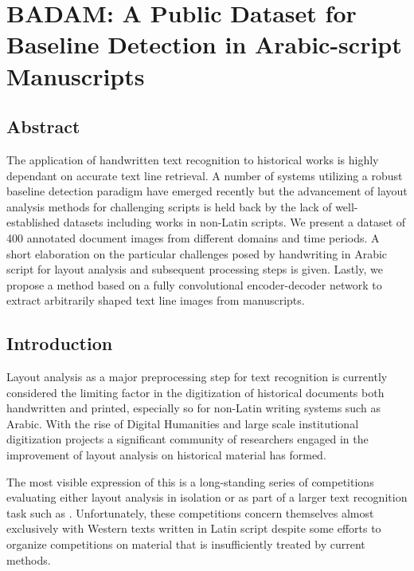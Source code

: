 \chapter{BADAM: A Public Dataset for Baseline Detection in Arabic-script Manuscripts}

\section{Abstract}
	The application of handwritten text recognition to historical works is
	highly dependant on accurate text line retrieval. A number of systems
	utilizing a robust baseline detection paradigm have emerged recently
	but the advancement of layout analysis methods for challenging scripts
	is held back by the lack of well-established datasets including works
	in non-Latin scripts. We present a dataset of 400 annotated document
	images from different domains and time periods. A short elaboration on
	the particular challenges posed by handwriting in Arabic script for
	layout analysis and subsequent processing steps is given.  Lastly, we
	propose a method based on a fully convolutional encoder-decoder network
	to extract arbitrarily shaped text line images from manuscripts.

\section{Introduction}

Layout analysis as a major preprocessing step for text recognition is currently
considered the limiting factor in the digitization of historical documents both
handwritten and printed, especially so for non-Latin writing systems such as
Arabic. With the rise of Digital Humanities and large scale institutional
digitization projects a significant community of researchers engaged in the
improvement of layout analysis on historical material has formed.

The most visible expression of this is a long-standing series of competitions
evaluating either layout analysis in isolation
\cite{gatos2011icdar2009,antonacopoulos2009icdar,gatos2010icfhr,antonacopoulos2011historical,antonacopoulos2013icdar,murdock2015icdar,diem2017cbad}
or as part of a larger text recognition task such as
\cite{antonacopoulos2015icdar2015}. Unfortunately, these competitions concern
themselves almost exclusively with Western texts written in Latin script
despite some efforts to organize competitions on material that is
insufficiently treated by current methods.

